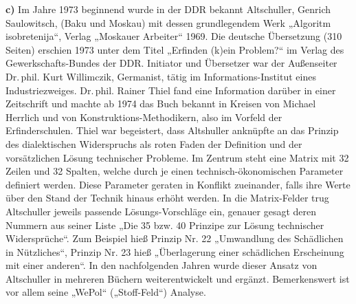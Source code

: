 \documentclass[11pt,a4paper]{article}
\begin{document}
\textbf{c)} 
Im Jahre 1973 beginnend wurde in der DDR bekannt Altschuller, Genrich
Saulowitsch, (Baku und Moskau) mit dessen grundlegendem Werk „Algoritm
isobretenija“, Verlag „Moskauer Arbeiter“ 1969. Die deutsche Übersetzung (310
Seiten) erschien 1973 unter dem Titel „Erfinden (k)ein Problem?“ im Verlag des
Gewerkschafts-Bundes der DDR. Initiator und Übersetzer war der Außenseiter
Dr.\,phil. Kurt Willimczik, Germanist, tätig im Informations-Institut eines
Industriezweiges. Dr.\,phil. Rainer Thiel fand eine Information darüber in
einer Zeitschrift und machte ab 1974 das Buch bekannt in Kreisen von Michael
Herrlich und von Konstruktions-Methodikern, also im Vorfeld der
Erfinderschulen. Thiel war begeistert, dass Altshuller anknüpfte an das Prinzip
des dialektischen Widerspruchs als roten Faden der Definition und der
vorsätzlichen Lösung technischer Probleme. Im Zentrum steht eine Matrix mit 32
Zeilen und 32 Spalten, welche durch je einen technisch-ökonomischen Parameter
definiert werden.  Diese Parameter geraten in Konflikt zueinander, falls ihre
Werte über den Stand der Technik hinaus erhöht werden. In die Matrix-Felder
trug Altschuller jeweils passende Lösungs-Vorschläge ein, genauer gesagt deren
Nummern aus seiner Liste „Die 35 bzw. 40 Prinzipe zur Lösung technischer
Widersprüche“.  Zum Beispiel hieß Prinzip Nr. 22 „Umwandlung des Schädlichen in
Nützliches“, Prinzip Nr. 23 hieß „Überlagerung einer schädlichen Erscheinung
mit einer anderen“. In den nachfolgenden Jahren wurde dieser Ansatz von
Altschuller in mehreren Büchern weiterentwickelt und ergänzt. Bemerkenswert ist
vor allem seine „WePol“ („Stoff-Feld“) Analyse.
\end{document}
